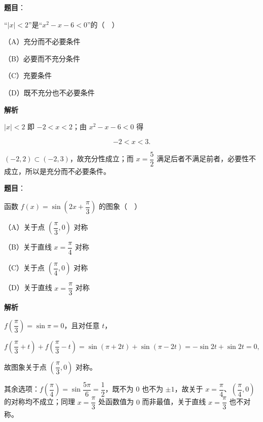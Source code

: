 \begin{answer}

\textbf{题目}：

“$|x|<2$”是“$x^2-x-6<0$”的（　）

（A）充分而不必要条件

（B）必要而不充分条件

（C）充要条件

（D）既不充分也不必要条件

\textbf{解析}

$|x|<2$ 即 $-2<x<2$；由 $x^2-x-6<0$ 得

\nopagebreak[4]
\[-2<x<3.\]

$(-2,2)\subset(-2,3)$，故充分性成立；而 $x=\dfrac52$ 满足后者不满足前者，必要性不成立，所以是充分而不必要条件。


\end{answer}
\begin{answer}

\textbf{题目}：

函数 $f(x)=\sin\left(2x+\dfrac{\pi}3\right)$ 的图象（　）

（A）关于点 $\left(\dfrac{\pi}3,0\right)$ 对称

（B）关于直线 $x=\dfrac{\pi}4$ 对称

（C）关于点 $\left(\dfrac{\pi}4,0\right)$ 对称

（D）关于直线 $x=\dfrac{\pi}3$ 对称

\textbf{解析}

$f\left(\dfrac{\pi}3\right)=\sin\pi=0$，且对任意 $t$，

\nopagebreak[4]
\[f\left(\frac{\pi}3+t\right)+f\left(\frac{\pi}3-t\right)=\sin(\pi+2t)+\sin(\pi-2t)=-\sin2t+\sin2t=0,\]

故图象关于点 $\left(\dfrac{\pi}3,0\right)$ 对称。

其余选项：$f\left(\dfrac{\pi}4\right)=\sin\dfrac{5\pi}6=\dfrac12$，既不为 $0$ 也不为 $\pm1$，故关于 $x=\dfrac{\pi}4$、$\left(\dfrac{\pi}4,0\right)$ 的对称均不成立；同理 $x=\dfrac{\pi}3$ 处函数值为 $0$ 而非最值，关于直线 $x=\dfrac{\pi}3$ 也不对称。


\end{answer}
